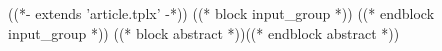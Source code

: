 ((*- extends 'article.tplx' -*))
((* block input_group *))
((* endblock input_group *))
((* block abstract *))\tableofcontents((* endblock abstract *))